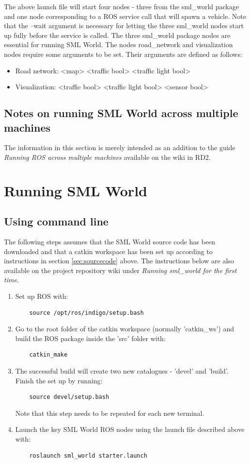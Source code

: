 \documentclass[11pt,a4paper]{book}
\begin{document}
\noindent The above launch file will start four nodes - three from the sml\_world package and one node corresponding to a ROS service call that will spawn a vehicle. Note that the --wait argument is necessary for letting the three sml\_world nodes start up fully before the service is called. The three sml\_world package nodes are essential for running SML World. The nodes road\_network and visualization nodes require some arguments to be set. Their arguments are defined as follows: \\
\begin{itemize}
\item Road network: <map> <traffic bool> <traffic light bool>
\item Visualization: <traffic bool> <traffic light bool> <sensor bool>
\end{itemize}

\subsection{Notes on running SML World across multiple machines}
The information in this section is merely intended as an addition to the guide \textit{Running ROS across multiple machines} available on the wiki in RD2.

\section{Running SML World}
\subsection{Using command line}
The following steps assumes that the SML World source code has been downloaded and that a catkin workspace has been set up according to instructions in section \ref{sec:sourcecode} above. The instructions below are also available on the project repository wiki under \textit{Running sml\_world for the first time}.

\begin{enumerate}
\item Set up ROS with:
	\begin{verbatim}
	source /opt/ros/indigo/setup.bash
	\end{verbatim}
\item Go to the root folder of the catkin workspace (normally 'catkin\_ws') and build the ROS package inside the 'src' folder with:
	\begin{verbatim}
	catkin_make
	\end{verbatim}
\item The successful build will create two new catalogues - 'devel' and 'build'. Finish the set up by running:
	\begin{verbatim}
	source devel/setup.bash
	\end{verbatim}
	Note that this step needs to be repeated for each new terminal.
\item Launch the key SML World ROS nodes using the launch file described above with:
	\begin{verbatim}
	roslaunch sml_world starter.launch
	\end{verbatim}
\end{enumerate}
\end{document}
